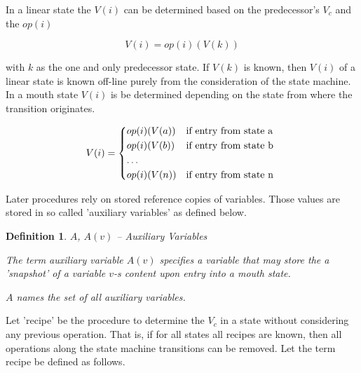 \documentclass[12pt,a4paper]{scrartcl}
\newtheorem{definition}{Definition}
\begin{document}
In a linear state the $V(i)$ can be determined based on the predecessor's
$V_c$ and the $op(i)$

\begin{equation} \label{eq:accumulation}
            V(i) = op(i)(V(k))                                         
\end{equation}

with $k$ as the one and only predecessor state. If $V(k)$ is known, then
$V(i)$ of a linear state is known off-line purely from the consideration of
the state machine.  In a mouth state $V(i)$ is be determined depending on the
state from where the transition originates.

\begin{equation} \label{eq:interference}
    V(i) = \begin{dcases*}
            op(i)(V(a)) & if entry from state a \\
            op(i)(V(b)) & if entry from state b \\
            \ldots \\
            op(i)(V(n)) & if entry from state n \\
            \end{dcases*}
\end{equation}

Later procedures rely on stored reference copies of variables. Those values
are stored in so called 'auxiliary variables' as defined below.

\begin{definition}
$A$, $A(v)$ -- Auxiliary Variables

The term auxiliary variable $A(v)$ specifies a variable that may store the
a 'snapshot' of a variable $v$-s content upon entry into a mouth state. 
   
$A$ names the set of all auxiliary variables.
\end{definition}

Let 'recipe' be the procedure to determine the $V_c$ in a state without
considering any previous operation. That is, if for all states all recipes are
known, then all operations along the state machine transitions can be removed.
Let the term recipe be defined as follows.
\end{document}
